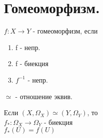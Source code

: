 \documentclass[geometry.tex]{subfiles}
\begin{document}
  \section{Гомеоморфизм.}

  \begin{definition}
      $f: X \rightarrow Y$ - гомеоморфизм, если\\
      \begin{enumerate}
          \item f - непр.
          \item f - биекция
          \item $f^{-1}$ - непр.
      \end{enumerate}
  \end{definition}

  \begin{hypothesis}
      $\simeq$ - отношение эквив.
  \end{hypothesis}

  \begin{theorem}
      Если $(X, \Omega_X) \simeq (Y, \Omega_Y)$, то\\
      $f_*: \Omega_X \rightarrow \Omega_Y$ - биекция\\
      $f_*(U) = f(U)$
  \end{theorem}
\end{document}
